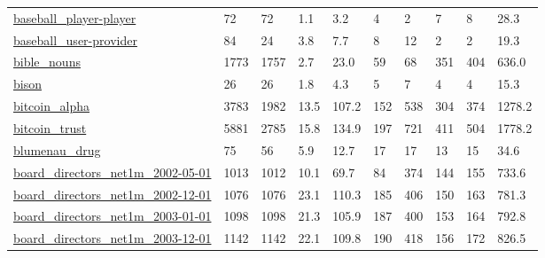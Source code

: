 \begin{longtable}{llllllllll}
 \href{http://orgnet.com/steroids.html}{baseball\_player-player}                                                             & 72         & 72    & 1.1    & 3.2    & 4     & 2      & 7      & 8      & 28.3    \\
 \href{http://orgnet.com/steroids.html}{baseball\_user-provider}                                                             & 84         & 24    & 3.8    & 7.7    & 8     & 12     & 2      & 2      & 19.3    \\
 \href{http://konect.cc/networks/moreno_names}{bible\_nouns}                                                                 & 1773       & 1757  & 2.7    & 23.0   & 59    & 68     & 351    & 404    & 636.0   \\
 \href{http://konect.cc/networks/moreno_bison}{bison}                                                                       & 26         & 26    & 1.8    & 4.3    & 5     & 7      & 4      & 4      & 15.3    \\
 \href{http://snap.stanford.edu/data/soc-sign-bitcoinalpha.html}{bitcoin\_alpha}                                             & 3783       & 1982  & 13.5   & 107.2  & 152   & 538    & 304    & 374    & 1278.2  \\
 \href{http://snap.stanford.edu/data/soc-sign-bitcoinotc.html}{bitcoin\_trust}                                               & 5881       & 2785  & 15.8   & 134.9  & 197   & 721    & 411    & 504    & 1778.2  \\
 \href{https://github.com/rionbr/DDIBlumenau/tree/master/csv}{blumenau\_drug}                                                & 75         & 56    & 5.9    & 12.7   & 17    & 17     & 13     & 15     & 34.6    \\
 \href{http://www.boardsandgender.com/data.php}{board\_directors\_net1m\_2002-05-01}                                           & 1013       & 1012  & 10.1   & 69.7   & 84    & 374    & 144    & 155    & 733.6   \\
 \href{http://www.boardsandgender.com/data.php}{board\_directors\_net1m\_2002-12-01}                                           & 1076       & 1076  & 23.1   & 110.3  & 185   & 406    & 150    & 163    & 781.3   \\
 \href{http://www.boardsandgender.com/data.php}{board\_directors\_net1m\_2003-01-01}                                           & 1098       & 1098  & 21.3   & 105.9  & 187   & 400    & 153    & 164    & 792.8   \\
 \href{http://www.boardsandgender.com/data.php}{board\_directors\_net1m\_2003-12-01}                                           & 1142       & 1142  & 22.1   & 109.8  & 190   & 418    & 156    & 172    & 826.5   \\

\end{longtable}
